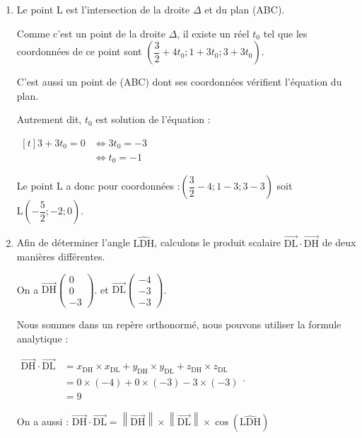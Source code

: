 \documentclass[10pt]{article}
\providecommand{\vectt}[1]{\overrightarrow{\mathrm{#1}}}
\begin{document}
\begin{enumerate}
\begin{enumerate}
	\end{enumerate}
	
	
	\item Le point L  est l'intersection de la droite $\Delta$ et du plan (ABC).
	
	Comme c'est un point de la droite $\Delta$, il existe un réel $t_0$ tel que les coordonnées de ce point sont $\left( \dfrac{3}{2} + 4t_0 ; 1+3t_0 ; 3+3t_0 \right) $.
	
	C'est aussi un point de (ABC) dont ses coordonnées vérifient l'équation du plan.
	
	Autrement dit, $t_0$ est solution de l'équation :
	
	$\begin{aligned}[t]
		 3 + 3t_0  = 0
		&\iff 3t_0 = -3 \\
		&\iff t_0 = -1
	\end{aligned}$
	
	Le point L a donc pour coordonnées :\quad $\left( \dfrac{3}{2} - 4  ; 1-3  ; 3-3  \right) $ \quad  soit $\mathrm{L}\left(-\dfrac{5}{2} ; -2 ; 0\right) $.

	
	\item  Afin de déterminer l'angle $\widehat{\mathrm{LDH}}$, calculons le produit scalaire $\vectt{DL} \cdot \vectt{DH}$ de deux manières différentes. 
	
On a  $\vectt{DH} \begin{pmatrix} 0 \\ 0\\ -3\end{pmatrix} $.
	\quad et  \quad $\vectt{DL} \begin{pmatrix} -4  \\ -3\\ -3 \end{pmatrix} $.
	
	
	
	Nous sommes dans un repère orthonormé, nous pouvons utiliser la formule analytique : 
	
	$\begin{aligned}  \vectt{DH} \cdot \vectt{DL} &= x_{\mathrm{DH}}\times x_{\mathrm{DL}} + y_{\mathrm{DH}}\times y_{\mathrm{DL}} +z_{\mathrm{DH}}\times z_{\mathrm{DL}}\\
		&= 0\times (-4) + 0 \times (-3) -3 \times (-3)\\
		&= 9
		\end{aligned}$. 
		
		
		
		
		On a aussi : 
$	\vectt{DH} \cdot \vectt{DL}=\left\|\vectt{DH}\right\|\times\left\|\vectt{DL}\right\|\times \cos(\widehat{\mathrm{LDH}})$


\end{enumerate}
\end{document}
